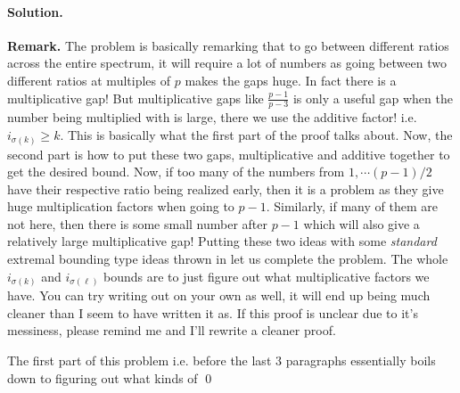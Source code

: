\documentclass[12pt]{article}
\newenvironment{solution}
{\paragraph{Solution.}}
{\qed\eject}
\begin{document}
\begin{solution}
\textbf{Remark.} The problem is basically remarking that to go between different ratios across the entire spectrum, it will require a lot of numbers as going between two different ratios at multiples of $p$ makes the gaps huge. In fact there is a multiplicative gap! But multiplicative gaps like $\frac{p-1}{p-3}$ is only a useful gap when the number being multiplied with is large, there we use the additive factor! i.e. $i_{\sigma(k)}\ge k$. This is basically what the first part of the proof talks about. Now, the second part is how to put these two gaps, multiplicative and additive together to get the desired bound. Now, if too many of the numbers from $1,\cdots (p-1)/2$ have their respective ratio being realized early, then it is a problem as they give huge multiplication factors when going to $p-1$. Similarly, if many of them are not here, then there is some small number after $p-1$ which will also give a relatively large multiplicative gap! Putting these two ideas with some \textit{standard} extremal bounding type ideas thrown in let us complete the problem. The whole $i_{\sigma(k)}$ and $i_{\sigma(\ell)}$ bounds are to just figure out what multiplicative factors we have. You can try writing out on your own as well, it will end up being much cleaner than I seem to have written it as. If this proof is unclear due to it's messiness, please remind me and I'll rewrite a cleaner proof.

The first part of this problem i.e. before the last $3$ paragraphs essentially boils down to figuring out what kinds of 
\end{solution}
\end{document}
